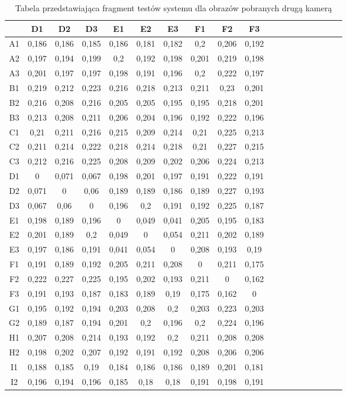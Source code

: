 \begin{table}
\caption{Tabela przedstawiająca fragment testów systemu dla obrazów pobranych drugą kamerą}
\label{tab:druga2}
\begin{tabular}{|c|c|c|c|c|c|c|c|c|c|c|c|c|c|c|c|c|c|c|}
\hline
 & D1 & D2 & D3 & E1 & E2 & E3 & F1 & F2 & F3 \\ \hline
A1 & 0,186&0,186&0,185&0,186&0,181&0,182&0,2&0,206&0,192 \\ \hline
A2 & 0,197&0,194&0,199&0,2&0,192&0,198&0,201&0,219&0,198 \\ \hline
A3 & 0,201&0,197&0,197&0,198&0,191&0,196&0,2&0,222&0,197 \\ \hline
B1 & 0,219&0,212&0,223&0,216&0,218&0,213&0,211&0,23&0,201 \\ \hline
B2 & 0,216&0,208&0,216&0,205&0,205&0,195&0,195&0,218&0,201 \\ \hline
B3 & 0,213&0,208&0,211&0,206&0,204&0,196&0,192&0,222&0,196 \\ \hline
C1 & 0,21&0,211&0,216&0,215&0,209&0,214&0,21&0,225&0,213 \\ \hline
C2 & 0,211&0,214&0,222&0,218&0,214&0,218&0,21&0,227&0,215 \\ \hline
C3 & 0,212&0,216&0,225&0,208&0,209&0,202&0,206&0,224&0,213 \\ \hline
D1 & 0&0,071&0,067&0,198&0,201&0,197&0,191&0,222&0,191 \\ \hline
D2 & 0,071&0&0,06&0,189&0,189&0,186&0,189&0,227&0,193 \\ \hline
D3 & 0,067&0,06&0&0,196&0,2&0,191&0,192&0,225&0,187 \\ \hline
E1 & 0,198&0,189&0,196&0&0,049&0,041&0,205&0,195&0,183 \\ \hline
E2 & 0,201&0,189&0,2&0,049&0&0,054&0,211&0,202&0,189 \\ \hline
E3 & 0,197&0,186&0,191&0,041&0,054&0&0,208&0,193&0,19 \\ \hline
F1 & 0,191&0,189&0,192&0,205&0,211&0,208&0&0,211&0,175 \\ \hline
F2 & 0,222&0,227&0,225&0,195&0,202&0,193&0,211&0&0,162 \\ \hline
F3 & 0,191&0,193&0,187&0,183&0,189&0,19&0,175&0,162&0 \\ \hline
G1 & 0,195&0,192&0,194&0,203&0,208&0,2&0,203&0,223&0,203 \\ \hline
G2 & 0,189&0,187&0,194&0,201&0,2&0,196&0,2&0,224&0,196 \\ \hline
H1 & 0,207&0,208&0,214&0,193&0,192&0,2&0,211&0,208&0,208 \\ \hline
H2 & 0,198&0,202&0,207&0,192&0,191&0,192&0,208&0,206&0,206 \\ \hline
I1 & 0,188&0,185&0,19&0,184&0,186&0,186&0,189&0,201&0,181 \\ \hline
I2 & 0,196&0,194&0,196&0,185&0,18&0,18&0,191&0,198&0,191 \\ \hline
\end{tabular}
\end{table}

